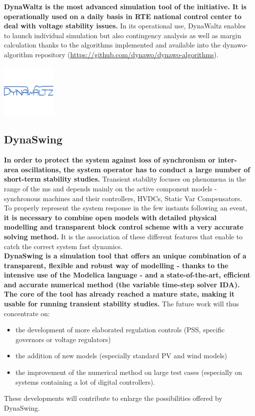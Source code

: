 \documentclass[a4paper, 12pt]{report}
\begin{document}
\textbf{DynaWaltz is the most advanced simulation tool of the \Dynawo initiative. It is operationally used on a daily basis in RTE national control center to deal with voltage stability issues.} In its operational use, DynaWaltz enables to launch individual simulation but also contingency analysis as well as  margin calculation thanks to the algorithms implemented and available into the dynawo-algorithm repository (\url{https://github.com/dynawo/dynawo-algorithms}).

\begin{center}
\includegraphics[width=0.2\textwidth]{../resources/DynaWaltz.png}
\end{center}

\newpage
\subsection{DynaSwing}

\textbf{In order to protect the system against loss of synchronism or inter-area oscillations, the system operator has to conduct a large number of short-term stability studies. }Transient stability focuses on phenomena in the range of the ms and depends mainly on the active component models - synchronous machines and their controllers, HVDCs, Static Var Compensators. \\

To properly represent the system response in the few instants following an event, \textbf{it is necessary to combine open models with detailed physical modelling and transparent block control scheme with a very accurate solving method.} It is the association of these different features that enable to catch the correct system fast dynamics. \\

\textbf{DynaSwing is a simulation tool that offers an unique combination of a transparent, flexible and robust way of modelling - thanks to the intensive use of the Modelica language - and a state-of-the-art, efficient and accurate numerical method (the variable time-step solver IDA).} \\

\textbf{The core of the tool has already reached a mature state, making it usable for running transient stability studies.} The future work will thus concentrate on:
\begin{itemize}
\item the development of more elaborated regulation controls (PSS, specific governors or voltage regulators)
\item the addition of new models (especially standard PV and wind models)
\item the improvement of the numerical method on large test cases (especially on systems containing a lot of digital controllers).
\end{itemize}
These developments will contribute to enlarge the possibilities offered by DynaSwing.
\end{document}
